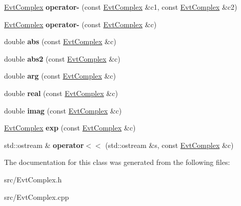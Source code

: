 \begin{DoxyCompactItemize}
\item 
\hypertarget{class_evt_complex_aebf3ed6891d2060d6c3112bf629100bf}{}\hyperlink{class_evt_complex}{Evt\+Complex} {\bfseries operator-\/} (const \hyperlink{class_evt_complex}{Evt\+Complex} \&c1, const \hyperlink{class_evt_complex}{Evt\+Complex} \&c2)\label{class_evt_complex_aebf3ed6891d2060d6c3112bf629100bf}

\item 
\hypertarget{class_evt_complex_ad48eadb56415482433eeb9c8908e3576}{}\hyperlink{class_evt_complex}{Evt\+Complex} {\bfseries operator-\/} (const \hyperlink{class_evt_complex}{Evt\+Complex} \&c)\label{class_evt_complex_ad48eadb56415482433eeb9c8908e3576}

\item 
\hypertarget{class_evt_complex_af726ace768009b7c34b0ed02810dc8a4}{}double {\bfseries abs} (const \hyperlink{class_evt_complex}{Evt\+Complex} \&c)\label{class_evt_complex_af726ace768009b7c34b0ed02810dc8a4}

\item 
\hypertarget{class_evt_complex_a59689972338e9e8462fef5b01289a94a}{}double {\bfseries abs2} (const \hyperlink{class_evt_complex}{Evt\+Complex} \&c)\label{class_evt_complex_a59689972338e9e8462fef5b01289a94a}

\item 
\hypertarget{class_evt_complex_af38e3c23adf905b08480ac93be90bb16}{}double {\bfseries arg} (const \hyperlink{class_evt_complex}{Evt\+Complex} \&c)\label{class_evt_complex_af38e3c23adf905b08480ac93be90bb16}

\item 
\hypertarget{class_evt_complex_a32b3ebb7ce578a5777858d9b8a8f47e9}{}double {\bfseries real} (const \hyperlink{class_evt_complex}{Evt\+Complex} \&c)\label{class_evt_complex_a32b3ebb7ce578a5777858d9b8a8f47e9}

\item 
\hypertarget{class_evt_complex_a08f93ab389a81cb04d9439c6829b9733}{}double {\bfseries imag} (const \hyperlink{class_evt_complex}{Evt\+Complex} \&c)\label{class_evt_complex_a08f93ab389a81cb04d9439c6829b9733}

\item 
\hypertarget{class_evt_complex_a6ffa44cf63579d02f7ad8266f5792805}{}\hyperlink{class_evt_complex}{Evt\+Complex} {\bfseries exp} (const \hyperlink{class_evt_complex}{Evt\+Complex} \&c)\label{class_evt_complex_a6ffa44cf63579d02f7ad8266f5792805}

\item 
\hypertarget{class_evt_complex_ab9d05094844cc9c7de899f6d76beea1b}{}std\+::ostream \& {\bfseries operator$<$$<$} (std\+::ostream \&s, const \hyperlink{class_evt_complex}{Evt\+Complex} \&c)\label{class_evt_complex_ab9d05094844cc9c7de899f6d76beea1b}

\end{DoxyCompactItemize}


The documentation for this class was generated from the following files\+:\begin{DoxyCompactItemize}
\item 
src/Evt\+Complex.\+h\item 
src/Evt\+Complex.\+cpp\end{DoxyCompactItemize}
